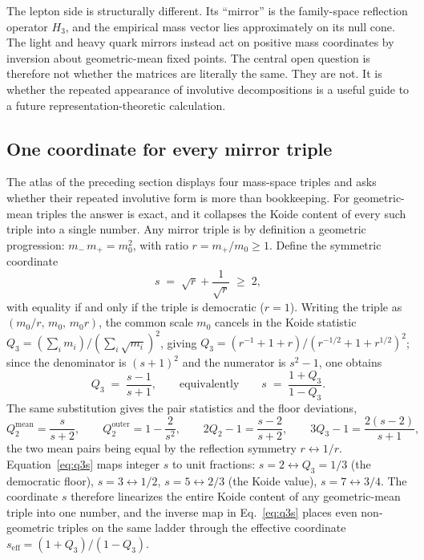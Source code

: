 \documentclass[aps,twocolumn,superscriptaddress,nofootinbib,floatfix]{revtex4-2}
\begin{document}
The lepton side is structurally different. Its ``mirror'' is the family-space reflection operator $H_3$, and the empirical mass vector lies approximately on its null cone. The light and heavy quark mirrors instead act on positive mass coordinates by inversion about geometric-mean fixed points. The central open question is therefore not whether the matrices are literally the same. They are not. It is whether the repeated appearance of involutive decompositions is a useful guide to a future representation-theoretic calculation.

\subsection{One coordinate for every mirror triple}
\label{sec:gpkoide}

The atlas of the preceding section displays four mass-space triples and asks whether their repeated involutive form is more than bookkeeping. For geometric-mean triples the answer is exact, and it collapses the Koide content of every such triple into a single number. Any mirror triple is by definition a geometric progression: $m_-\,m_+ = m_0^2$, with ratio $r = m_+/m_0 \geq 1$. Define the symmetric coordinate
\begin{equation}
s \;=\; \sqrt{r} + \frac{1}{\sqrt{r}} \;\geq\; 2 ,
\label{eq:sdef}
\end{equation}
with equality if and only if the triple is democratic ($r=1$). Writing the triple as $(m_0/r,\,m_0,\,m_0 r)$, the common scale $m_0$ cancels in the Koide statistic $Q_3 = (\sum_i m_i)/(\sum_i\sqrt{m_i})^2$, giving $Q_3 = (r^{-1}+1+r)/(r^{-1/2}+1+r^{1/2})^2$; since the denominator is $(s+1)^2$ and the numerator is $s^2-1$, one obtains
\begin{equation}
Q_3 \;=\; \frac{s-1}{s+1},
\qquad\text{equivalently}\qquad
s \;=\; \frac{1+Q_3}{1-Q_3} .
\label{eq:q3s}
\end{equation}
The same substitution gives the pair statistics and the floor deviations,
\begin{equation}
Q_2^{\mathrm{mean}} = \frac{s}{s+2},
\qquad
Q_2^{\mathrm{outer}} = 1 - \frac{2}{s^2},
\qquad
2Q_2 - 1 = \frac{s-2}{s+2},
\qquad
3Q_3 - 1 = \frac{2(s-2)}{s+1} ,
\label{eq:q2forms}
\end{equation}
the two mean pairs being equal by the reflection symmetry $r\leftrightarrow 1/r$. Equation~\eqref{eq:q3s} maps integer $s$ to unit fractions: $s=2\leftrightarrow Q_3=1/3$ (the democratic floor), $s=3\leftrightarrow 1/2$, $s=5\leftrightarrow 2/3$ (the Koide value), $s=7\leftrightarrow 3/4$. The coordinate $s$ therefore linearizes the entire Koide content of any geometric-mean triple into one number, and the inverse map in Eq.~\eqref{eq:q3s} places even non-geometric triples on the same ladder through the effective coordinate $s_{\mathrm{eff}}=(1+Q_3)/(1-Q_3)$.
\end{document}
